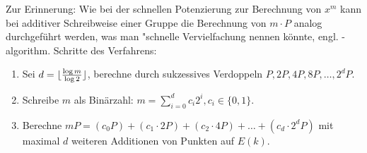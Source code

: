 \begin{bem}
	Zur Erinnerung: Wie bei der schnellen Potenzierung zur Berechnung von $x^m$ kann bei additiver Schreibweise einer Gruppe die Berechnung von $m \cdot P$ analog durchgeführt werden, was man "schnelle Vervielfachung nennen könnte, engl. -algorithm.
	Schritte des Verfahrens:
	\begin{enumerate}[1)]
		\item Sei $d = \lfloor\frac{\log m}{\log 2}\rfloor$, berechne durch sukzessives Verdoppeln $P, 2P, 4P, 8P, \dots, 2^d P$.
		\item Schreibe $m$ als Binärzahl: $m = \sum_{i=0}^d c_i 2^i, c_i \in \{0,1\}$.
		\item Berechne $mP = (c_0 P) + (c_1 \cdot 2P) + (c_2 \cdot 4P) + \dots + (c_d \cdot 2^dP)$ mit maximal $d$ weiteren Additionen von Punkten auf $E(k)$.
	\end{enumerate}
\end{bem}
\cleardoubleoddemptypage